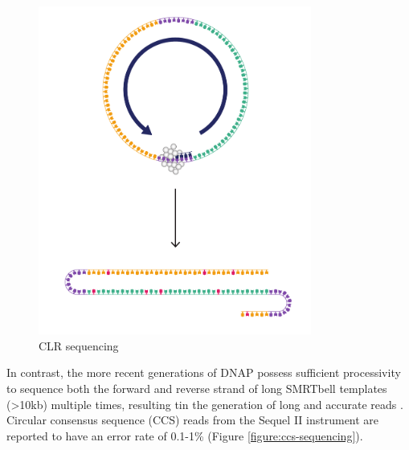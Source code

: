 \begin{figure}[h!]
\caption{CLR sequencing}
\label{figure:clr-sequencing}
\begin{centering}
\includegraphics[width=0.8\textwidth]{Vector/CLR_sequencing.pdf}
\end{centering}
\end{figure}

In contrast, the more recent generations of DNAP possess sufficient processivity to sequence both the forward and reverse strand of long SMRTbell templates (>10kb) multiple times, resulting tin the generation of long and accurate reads \cite{Wenger2019-pw}. Circular consensus sequence (CCS) reads from the Sequel II instrument are reported to have an error rate of 0.1-1\% \cite{Wenger2019-pw} (Figure \ref{figure:ccs-sequencing}).

